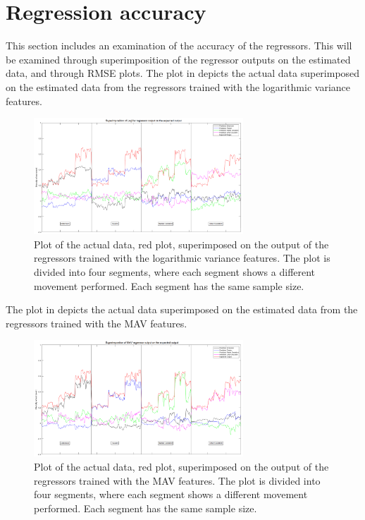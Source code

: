\section{Regression accuracy}
This section includes an examination of the accuracy of the regressors. This will be examined through superimposition of the regressor outputs on the estimated data, and through RMSE plots. 
The plot in  depicts the actual data superimposed on the estimated data from the regressors trained with the logarithmic variance features. 

\begin{figure}[H]
	\includegraphics[width=0.7\textwidth]{figures/results/SuperPositionTestDataLogVar}  %
	\caption{Plot of the actual data, red plot, superimposed on the output of the regressors trained with the logarithmic variance features. The plot is divided into four segments, where each segment shows a different movement performed. Each segment has the same sample size.}
	\label{fig:SuperPositionTestDataLogVar}  %
\end{figure}

The plot in  depicts the actual data superimposed on the estimated data from the regressors trained with the MAV features. 

\begin{figure}[H]
	\includegraphics[width=0.7\textwidth]{figures/results/SuperPositionTestDataMAV}  %
	\caption{Plot of the actual data, red plot, superimposed on the output of the regressors trained with the MAV features. The plot is divided into four segments, where each segment shows a different movement performed. Each segment has the same sample size.}
	\label{fig:SuperPositionTestDataMAV}  %
\end{figure}


